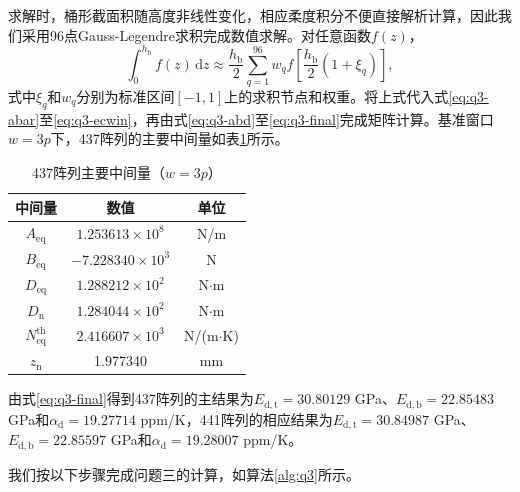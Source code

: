 \documentclass[draft,12pt,a4paper]{ctexart}
\theoremstyle{definition}
\newcommand{\diff}{\mathrm{d}}
\begin{document}
求解时，桶形截面积随高度非线性变化，相应柔度积分不便直接解析计算，因此我们采用96点Gauss-Legendre求积完成数值求解。对任意函数$f(z)$，
\begin{equation}\label{eq:q3-gauss}
\int_0^{h_{\mathrm b}}f(z)\,\diff z
\approx\frac{h_{\mathrm b}}{2}
\sum_{q=1}^{96}w_q
f\!\left[\frac{h_{\mathrm b}}{2}(1+\xi_q)\right],
\end{equation}
式中$\xi_q$和$w_q$分别为标准区间$[-1,1]$上的求积节点和权重。将上式代入式\eqref{eq:q3-abar}至\eqref{eq:q3-ecwin}，再由式\eqref{eq:q3-abd}至\eqref{eq:q3-final}完成矩阵计算。基准窗口$w=3p$下，437阵列的主要中间量如表\ref{tab:q3-mid}所示。

\begin{table}[H]\centering
  \caption{437阵列主要中间量（$w=3p$）}\label{tab:q3-mid}
  \small
  \begin{tabular}{ccc}
    \toprule
    \textbf{中间量} & \textbf{数值} & \textbf{单位} \\
    \midrule
    $A_{\mathrm{eq}}$ & $1.253613\times10^8$ & N/m \\
    $B_{\mathrm{eq}}$ & $-7.228340\times10^3$ & N \\
    $D_{\mathrm{eq}}$ & $1.288212\times10^2$ & N$\cdot$m \\
    $D_{\mathrm n}$ & $1.284044\times10^2$ & N$\cdot$m \\
    $N_{\mathrm{eq}}^{\mathrm{th}}$ & $2.416607\times10^3$ & N/(m$\cdot$K) \\
    $z_{\mathrm n}$ & 1.977340 & mm \\
    \bottomrule
  \end{tabular}
\end{table}

由式\eqref{eq:q3-final}得到437阵列的主结果为$E_{\mathrm{d,t}}=30.80129$ GPa、$E_{\mathrm{d,b}}=22.85483$ GPa和$\alpha_{\mathrm d}=19.27714$ ppm/K，441阵列的相应结果为$E_{\mathrm{d,t}}=30.84987$ GPa、$E_{\mathrm{d,b}}=22.85597$ GPa和$\alpha_{\mathrm d}=19.28007$ ppm/K。

我们按以下步骤完成问题三的计算，如算法\ref{alg:q3}所示。
\end{document}
